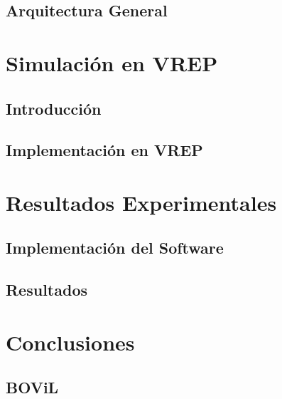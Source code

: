 \documentclass[11pt, oneside]{book} %
\begin{document}
\newpage
\section{Arquitectura General} \label{sec:SoftArch}



\chapter{Simulaci\'on en VREP}
\section{Introducci\'on}


\section{Implementaci\'on en VREP}


\chapter{Resultados Experimentales}
\section{Implementaci\'on del Software}


\section{Resultados}



\chapter{Conclusiones} \label{chap:c6_conclusions}


\begin{appendix}
\chapter{BOViL} \label{chap:c6_bovil}

\end{appendix}
\end{document}
